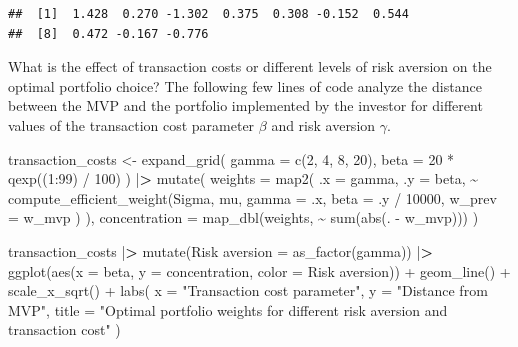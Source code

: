 \documentclass[
]{krantz}
\newenvironment{Shaded}{\begin{snugshade}}{\end{snugshade}}
\newcommand{\AttributeTok}[1]{\textcolor[rgb]{0.61,0.61,0.61}{#1}}
\newcommand{\DecValTok}[1]{\textcolor[rgb]{0.06,0.06,0.06}{#1}}
\newcommand{\ErrorTok}[1]{\textcolor[rgb]{0.14,0.14,0.14}{\textbf{#1}}}
\newcommand{\FunctionTok}[1]{\textcolor[rgb]{0,0,0}{#1}}
\newcommand{\NormalTok}[1]{#1}
\newcommand{\OtherTok}[1]{\textcolor[rgb]{0.37,0.37,0.37}{#1}}
\newcommand{\SpecialCharTok}[1]{\textcolor[rgb]{0,0,0}{#1}}
\newcommand{\StringTok}[1]{\textcolor[rgb]{0.5,0.5,0.5}{#1}}
\begin{document}
\begin{verbatim}
##  [1]  1.428  0.270 -1.302  0.375  0.308 -0.152  0.544
##  [8]  0.472 -0.167 -0.776
\end{verbatim}

What is the effect of transaction costs or different levels of risk aversion on the optimal portfolio choice? The following few lines of code analyze the distance between the MVP and the portfolio implemented by the investor for different values of the transaction cost parameter \(\beta\) and risk aversion \(\gamma\).

\begin{Shaded}
\begin{Highlighting}[]
\NormalTok{transaction\_costs }\OtherTok{\textless{}{-}} \FunctionTok{expand\_grid}\NormalTok{(}
  \AttributeTok{gamma =} \FunctionTok{c}\NormalTok{(}\DecValTok{2}\NormalTok{, }\DecValTok{4}\NormalTok{, }\DecValTok{8}\NormalTok{, }\DecValTok{20}\NormalTok{),}
  \AttributeTok{beta =} \DecValTok{20} \SpecialCharTok{*} \FunctionTok{qexp}\NormalTok{((}\DecValTok{1}\SpecialCharTok{:}\DecValTok{99}\NormalTok{) }\SpecialCharTok{/} \DecValTok{100}\NormalTok{)}
\NormalTok{) }\SpecialCharTok{|}\ErrorTok{\textgreater{}}
  \FunctionTok{mutate}\NormalTok{(}
    \AttributeTok{weights =} \FunctionTok{map2}\NormalTok{(}
      \AttributeTok{.x =}\NormalTok{ gamma,}
      \AttributeTok{.y =}\NormalTok{ beta,}
      \SpecialCharTok{\textasciitilde{}} \FunctionTok{compute\_efficient\_weight}\NormalTok{(Sigma,}
\NormalTok{        mu,}
        \AttributeTok{gamma =}\NormalTok{ .x,}
        \AttributeTok{beta =}\NormalTok{ .y }\SpecialCharTok{/} \DecValTok{10000}\NormalTok{,}
        \AttributeTok{w\_prev =}\NormalTok{ w\_mvp}
\NormalTok{      )}
\NormalTok{    ),}
    \AttributeTok{concentration =} \FunctionTok{map\_dbl}\NormalTok{(weights, }\SpecialCharTok{\textasciitilde{}} \FunctionTok{sum}\NormalTok{(}\FunctionTok{abs}\NormalTok{(. }\SpecialCharTok{{-}}\NormalTok{ w\_mvp)))}
\NormalTok{  )}

\NormalTok{transaction\_costs }\SpecialCharTok{|}\ErrorTok{\textgreater{}}
  \FunctionTok{mutate}\NormalTok{(}\StringTok{\textasciigrave{}}\AttributeTok{Risk aversion}\StringTok{\textasciigrave{}} \OtherTok{=} \FunctionTok{as\_factor}\NormalTok{(gamma)) }\SpecialCharTok{|}\ErrorTok{\textgreater{}}
  \FunctionTok{ggplot}\NormalTok{(}\FunctionTok{aes}\NormalTok{(}\AttributeTok{x =}\NormalTok{ beta, }\AttributeTok{y =}\NormalTok{ concentration, }\AttributeTok{color =} \StringTok{\textasciigrave{}}\AttributeTok{Risk aversion}\StringTok{\textasciigrave{}}\NormalTok{)) }\SpecialCharTok{+}
  \FunctionTok{geom\_line}\NormalTok{() }\SpecialCharTok{+}
  \FunctionTok{scale\_x\_sqrt}\NormalTok{() }\SpecialCharTok{+}
  \FunctionTok{labs}\NormalTok{(}
    \AttributeTok{x =} \StringTok{"Transaction cost parameter"}\NormalTok{,}
    \AttributeTok{y =} \StringTok{"Distance from MVP"}\NormalTok{,}
    \AttributeTok{title =} \StringTok{"Optimal portfolio weights for different risk aversion and transaction cost"}
\NormalTok{  )}
\end{Highlighting}
\end{Shaded}
\end{document}
